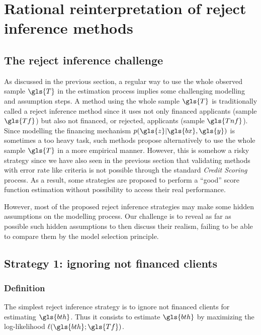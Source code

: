 \section{Rational reinterpretation of {reject inference} methods} \label{sec:methods_reject}

\subsection{The reject inference challenge} \label{subsec:challenge}

As discussed in the previous section, a regular way to use the whole observed sample $\gls{T}$ in the estimation process implies some challenging modelling and assumption steps. A method using the whole sample $\gls{T}$ is traditionally called a {reject inference} method since it uses not only financed applicants (sample $\gls{Tf}$) but also not financed, or rejected, applicants (sample $\gls{Tnf}$).
Since modelling the financing mechanism $p(\gls{z} | \gls{bx}, \gls{y})$ is sometimes a too heavy task, such methods propose alternatively to use the whole sample $\gls{T}$ in a more empirical manner. However, this is somehow a risky strategy since we have also seen in the previous section that validating methods with error rate like criteria is not possible through the standard \textit{Credit Scoring} process. As a result, some strategies are proposed to perform a ``good'' \gls{score} function estimation without possibility to access their real performance.

However, most of the proposed reject inference strategies may make some hidden assumptions on the modelling process. Our challenge is to reveal as far as possible such hidden assumptions to then discuss their realism,  
failing to be able to compare them by the model selection principle.

\subsection{Strategy 1: ignoring not financed clients} \label{subsec:strat1}

\subsubsection{Definition}
The simplest reject inference strategy is to ignore not financed clients for estimating $\gls{bth}$. Thus it consists to estimate $\gls{bth}$ by maximizing the log-likelihood $\ell(\gls{bth};\gls{Tf})$.

